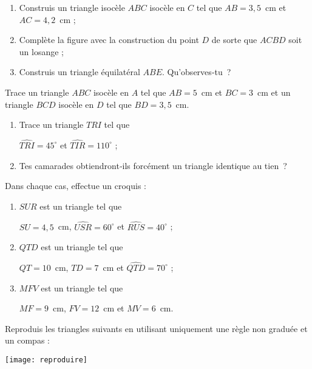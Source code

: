 \begin{exercice}
 \begin{enumerate}
  \item Construis un triangle isocèle $ABC$ isocèle en $C$ tel que $AB = 3,5$ cm et $AC = 4,2$ cm ;
  \item Complète la figure avec la construction du point $D$ de sorte que $ACBD$ soit un losange ;
  \item Construis un triangle équilatéral $ABE$.
Qu'observes‑tu ?
   \end{enumerate}
\end{exercice}


\begin{exercice}
Trace un triangle $ABC$ isocèle en $A$ tel que $AB = 5$ cm et $BC = 3$ cm et un triangle $BCD$ isocèle en $D$ tel que $BD = 3,5$ cm.
\end{exercice}


\begin{exercice}
 \begin{enumerate}
  \item Trace un triangle $TRI$ tel que 
  
  $\widehat{TRI} = 45^\circ$ et  $\widehat{TIR} = 110^\circ$ ;
  \item Tes camarades obtiendront‑ils forcément un triangle identique au tien ?
  \end{enumerate}
\end{exercice}


\begin{exercice}
Dans chaque cas, effectue un croquis :
 \begin{enumerate}
  \item $SUR$ est un triangle tel que 
  
  $SU = 4,5$ cm, $\widehat{USR} = 60^\circ$ et $\widehat{RUS} = 40^\circ$ ;
  \item $QTD$ est un triangle tel que 
  
  $QT = 10$ cm, $TD = 7$ cm et $\widehat{QTD} = 70^\circ$ ;
  \item $MFV$ est un triangle tel que 
  
  $MF = 9$ cm, $FV = 12$ cm et $MV = 6$ cm.
  \end{enumerate}
\end{exercice}


\begin{exercice}
Reproduis les triangles suivants en utilisant uniquement une règle non graduée et un compas :
\begin{center} \texttt{[image: reproduire]} \end{center}
\end{exercice}


